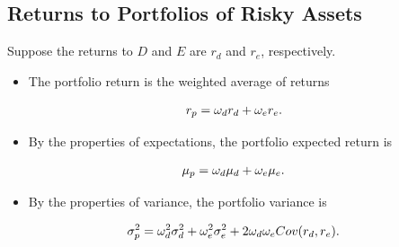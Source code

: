 \documentclass[letterpaper,10pt,english]{sphinxmanual}
\begin{document}
\subsection{Returns to Portfolios of Risky Assets}
\label{portfolioOpt:returns-to-portfolios-of-risky-assets}
Suppose the returns to $D$ and $E$ are $r_d$ and
$r_e$, respectively.
\begin{itemize}
\item {} 
The portfolio return is the weighted average of returns

\end{itemize}
\begin{gather}
\begin{split}r_p  = \omega_d r_d + \omega_e r_e.\end{split}\notag
\end{gather}\begin{itemize}
\item {} 
By the properties of expectations, the portfolio expected return is

\end{itemize}
\begin{gather}
\begin{split}\mu_p = \omega_d \mu_d + \omega_e \mu_e.\end{split}\notag
\end{gather}\begin{itemize}
\item {} 
By the properties of variance, the portfolio variance is

\end{itemize}
\begin{gather}
\begin{split}\sigma^2_p = \omega^2_d \sigma^2_d + \omega^2_e \sigma^2_e + 2
\omega_d \omega_e Cov(r_d, r_e).\end{split}\notag
\end{gather}
\end{document}
